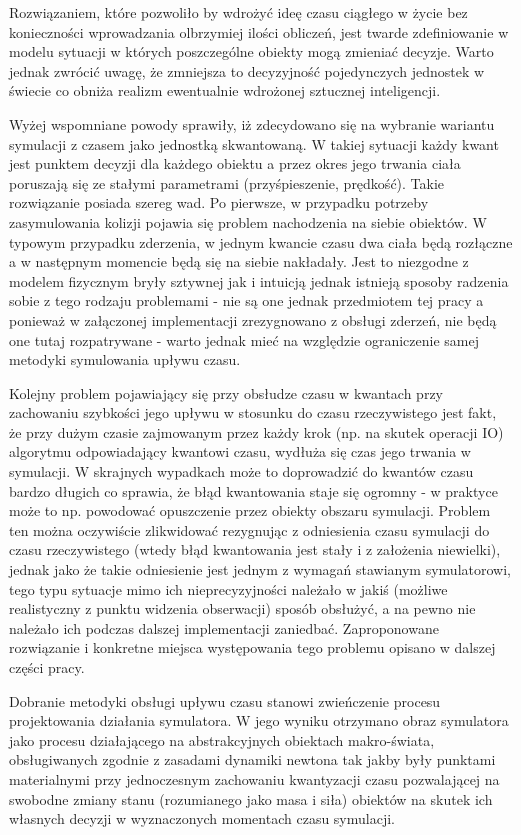 {{Rozwiązaniem, które pozwoliło by wdrożyć ideę czasu ciągłego w życie bez konieczności wprowadzania olbrzymiej ilości obliczeń, jest twarde zdefiniowanie w modelu sytuacji w których poszczególne obiekty mogą zmieniać decyzje. Warto jednak zwrócić uwagę, że zmniejsza to decyzyjność pojedynczych jednostek w świecie co obniża realizm ewentualnie wdrożonej sztucznej inteligencji.
}
\par{
Wyżej wspomniane powody sprawiły, iż zdecydowano się na wybranie wariantu symulacji z czasem jako jednostką skwantowaną. W takiej sytuacji każdy kwant jest punktem decyzji dla każdego obiektu a przez okres jego trwania ciała poruszają się ze stałymi parametrami (przyśpieszenie, prędkość).
Takie rozwiązanie posiada szereg wad. Po pierwsze, w przypadku potrzeby zasymulowania kolizji pojawia się problem nachodzenia na siebie obiektów. W typowym przypadku zderzenia, w jednym kwancie czasu dwa ciała będą rozłączne a w następnym momencie będą się na siebie nakładały. Jest to niezgodne z modelem fizycznym bryły sztywnej jak i intuicją jednak istnieją sposoby radzenia sobie z tego rodzaju problemami - nie są one jednak przedmiotem tej pracy a ponieważ w załączonej implementacji zrezygnowano z obsługi zderzeń, nie będą one tutaj rozpatrywane - warto jednak mieć na względzie ograniczenie samej metodyki symulowania upływu czasu.
}
\par{
Kolejny problem pojawiający się przy obsłudze czasu w kwantach przy zachowaniu szybkości jego upływu w stosunku do czasu rzeczywistego jest fakt, że przy dużym czasie zajmowanym przez każdy krok (np. na skutek operacji IO) algorytmu odpowiadający kwantowi czasu, wydłuża się czas jego trwania w symulacji. W skrajnych wypadkach może to doprowadzić do kwantów czasu bardzo długich co sprawia, że błąd kwantowania staje się ogromny - w praktyce może to np. powodować opuszczenie przez obiekty obszaru symulacji.
Problem ten można oczywiście zlikwidować rezygnując z odniesienia czasu symulacji do czasu rzeczywistego (wtedy błąd kwantowania jest stały i z założenia niewielki), jednak jako że takie odniesienie jest jednym z wymagań stawianym symulatorowi, tego typu sytuacje mimo ich nieprecyzyjności należało w jakiś (możliwe realistyczny z punktu widzenia obserwacji) sposób obsłużyć, a na pewno nie należało ich podczas dalszej implementacji zaniedbać. Zaproponowane rozwiązanie i konkretne miejsca występowania tego problemu opisano w dalszej części pracy.
}
\par{
Dobranie metodyki obsługi upływu czasu stanowi zwieńczenie procesu projektowania działania symulatora. W jego wyniku otrzymano obraz symulatora jako procesu działającego na abstrakcyjnych obiektach makro-świata, obsługiwanych zgodnie z zasadami dynamiki newtona tak jakby były punktami materialnymi przy jednoczesnym zachowaniu kwantyzacji czasu pozwalającej na swobodne zmiany stanu (rozumianego jako masa i siła) obiektów na skutek ich własnych decyzji w wyznaczonych momentach czasu symulacji.
}

}
